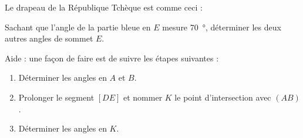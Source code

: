 
\begin{exercice}\label{exo2smath-0239}

    Le drapeau de la République Tchèque est comme ceci :
    \begin{center}

    \end{center}
    Sachant que l'angle de la partie bleue en \( E\) mesure \SI{70}{\degree}, déterminer les deux autres angles de sommet \( E\).
    
    Aide : une façon de faire est de suivre les étapes suivantes :
    \begin{enumerate}
        \item
            Déterminer les angles en \( A\) et \( B\).
        \item
            Prolonger le segment \( [DE]\) et nommer \( K\) le point d'intersection avec \( (AB)\).
        \item
            Déterminer les angles en \( K\).
    \end{enumerate}
    

\end{exercice}
